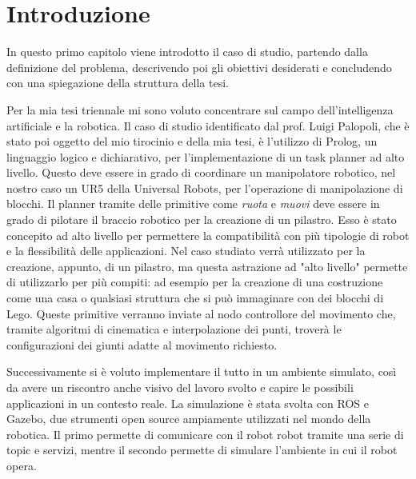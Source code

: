 \clearpage
\newpage
\chapter{Introduzione}
\label{cha:intro}


In questo primo capitolo viene introdotto il caso di studio, partendo dalla definizione del problema, descrivendo poi gli obiettivi desiderati
e concludendo con una spiegazione della struttura della tesi.

Per la mia tesi triennale mi sono voluto concentrare sul campo dell'intelligenza artificiale e la robotica. Il caso di studio identificato
dal prof. Luigi Palopoli, che è stato poi oggetto del mio tirocinio e della mia tesi, è l'utilizzo di Prolog, un linguaggio logico e dichiarativo, per l'implementazione di un task planner ad alto livello.
Questo deve essere in grado di coordinare un manipolatore robotico, nel nostro caso un UR5 della Universal Robots, per l'operazione di manipolazione di blocchi.
Il planner tramite delle primitive come \textit{ruota} e \textit{muovi} deve essere in grado di pilotare il braccio robotico per la
creazione di un pilastro. Esso è stato concepito ad alto livello per permettere la compatibilità con più tipologie di robot e la flessibilità
delle applicazioni. Nel caso studiato verrà utilizzato per la creazione, appunto, di un pilastro, ma questa astrazione ad
"alto livello" permette di utilizzarlo per più compiti: ad esempio per la creazione di una costruzione come una casa o qualsiasi struttura
che si può immaginare con dei blocchi di Lego. Queste primitive verranno inviate al nodo controllore del movimento che, tramite algoritmi di cinematica e
interpolazione dei punti, troverà le configurazioni dei giunti adatte al movimento richiesto. 

Successivamente si è voluto implementare il tutto in un
ambiente simulato, così da avere un riscontro anche visivo del lavoro svolto e capire le possibili applicazioni in un contesto reale.
La simulazione è stata svolta con ROS e Gazebo, due strumenti open source ampiamente utilizzati nel mondo della robotica. Il primo permette di
comunicare con il robot robot tramite una serie di topic e servizi, mentre il secondo permette di simulare l'ambiente in cui il robot opera.

